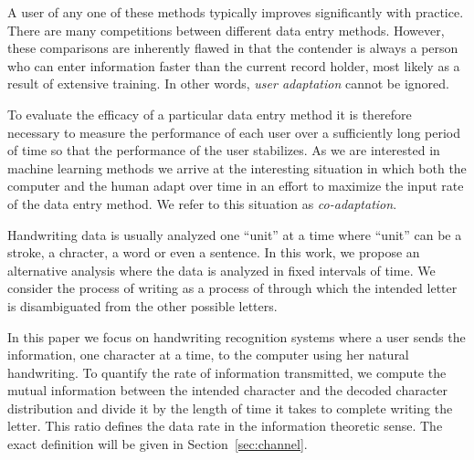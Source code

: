 \documentclass{sigchi}
\begin{document}
A user of any one of these methods typically improves significantly
with practice. There are many competitions between different data
entry methods. However, these comparisons are inherently flawed in
that the contender is always a person who can enter information faster
than the current record holder, most likely as a result of extensive
training. In other words, {\em user adaptation} cannot be ignored.

To evaluate the efficacy of a particular data entry method it is
therefore necessary to measure the performance of each user over a
sufficiently long period of time so that the performance of the user
stabilizes. As we are interested in machine learning methods we arrive
at the interesting situation in which both the computer and the human
adapt over time in an effort to maximize the input rate of the
data entry method. We refer to this situation as {\em co-adaptation}.
 



Handwriting data is usually analyzed one ``unit'' at a time where
``unit'' can be a stroke, a chracter, a word or even a
sentence. In this work, we propose an alternative analysis where the
data is analyzed in fixed intervals of time. We consider the process
of writing as a process of through which the intended letter is
disambiguated from the other possible letters. 



In this paper we focus on handwriting recognition systems where a user
sends the information, one character at a time, to the computer using
her natural handwriting. To quantify the rate of information
transmitted, we compute the mutual information between the intended
character and the decoded character distribution and divide it by the
length of time it takes to complete writing the letter. This ratio
defines the data rate in the information theoretic sense.  The exact
definition will be given in Section~\ref{sec:channel}.
\end{document}
